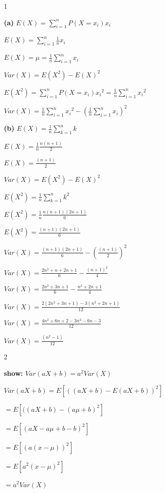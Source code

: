 \documentclass[12 pt]{article}
\begin{document}
    \begin{exercise}{1}
    \hfill
    
    \textbf{(a)} $E(X) = \sum_{i=1}^{n} P(X = x_i) x_i$

    $E(X) = \sum_{i=1}^{n} \frac{1}{n} x_i$

    $E(X) = \mu = \frac{1}{n} \sum_{i=1}^{n} x_i$

    \hfill

    $Var(X) = E(X^2) - E(X)^2$

    $E(X^2) = \sum_{i=1}^{n} P(X = x_i) {x_i}^2 = \frac{1}{n} \sum_{i=1}^{n} {x_i}^2$

    $Var(X) = \frac{1}{n} \sum_{i=1}^{n} {x_i}^2 - (\frac{1}{n} \sum_{i=1}^{n} x_i)^2$

    \hfill

    \textbf{(b)} $E(X) = \frac{1}{n} \sum_{k=1}^{n} k$

    $E(X) = \frac{1}{n} \frac{n(n+1)}{2}$

    $E(X) = \frac{(n+1)}{2}$

    \hfill

    $Var(X) = E(X^2) - E(X)^2$

    $E(X^2) = \frac{1}{n} \sum_{k=1}^{n} k^2$

    $E(X^2) = \frac{1}{n} \frac{n(n+1)(2n+1)}{6}$

    $E(X^2) = \frac{(n+1)(2n+1)}{6}$

    \hfill

    $Var(X) = \frac{(n+1)(2n+1)}{6} - (\frac{(n+1)}{2})^2$

    $Var(X) = \frac{2n^2 + n + 2n + 1}{6} - \frac{(n+1)^2}{4}$

    $Var(X) = \frac{2n^2 + 3n + 1}{6} - \frac{n^2 + 2n + 1}{4}$

    $Var(X) = \frac{2(2n^2 + 3n + 1) - 3(n^2 + 2n + 1)}{12}$

    $Var(X) = \frac{4n^2 + 6n + 2 - 3n^2 - 6n - 3}{12}$

    $Var(X) = \frac{(n^2 - 1)}{12}$
    \hfill
    \end{exercise}



    \begin{exercise}{2}
    \hfill

    \textbf{show:} $Var(aX+b) = a^2 Var(X)$

    $Var(aX+b) = E[((aX+b) - E(aX+b))^2]$
    
    $= E[((aX+b) - (a\mu +b)^2]$

    $= E[(aX-a\mu + b - b)^2]$

    $= E[(a(x - \mu))^2]$

    $= E[a^2(x - \mu)^2]$

    $= a^2 Var(X)$

    \hfill
    \end{exercise}
\end{document}

